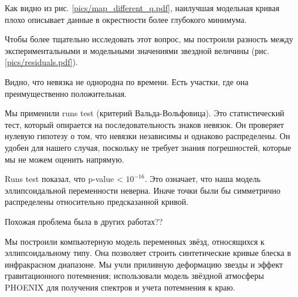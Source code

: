 \label{sect:RunsTest}

Как видно из рис. \ref{pics/map_different_q.pdf}, наилучшая модельная кривая плохо описывает данные в окрестности более глубокого минимума.

Чтобы более тщательно исследовать этот вопрос, мы построили разность между экспериментальными и модельными значениями звездной величины (рис. \ref{pics/residuals.pdf}).

Видно, что невязка не однородна по времени. Есть участки, где она преимущественно положительная.


Мы применили runs test (критерий Вальда-Вольфовица). Это статистический тест, который опирается на последовательность знаков невязок. Он проверяет нулевую гипотезу о том, что невязки независимы и однаково распределены. Он удобен для нашего случая, поскольку не требует знания погрешностей, которые мы не можем оценить напрямую.

Runs test показал, что p-value < $10^{-16}$. Это означает, что наша модель эллипсоидальной переменности неверна. Иначе точки были бы симметрично распределены относительно предсказанной кривой.

Похожая проблема была в других работах??








Мы построили компьютерную модель переменных звёзд, относящихся к эллипсоидальному типу. Она позволяет строить синтетические кривые блеска в инфракрасном диапазоне. Мы учли приливную деформацию звезды и эффект гравитационного потемнения; использовали модель звёздной атмосферы PHOENIX для получения спектров и учета потемнения к краю.

